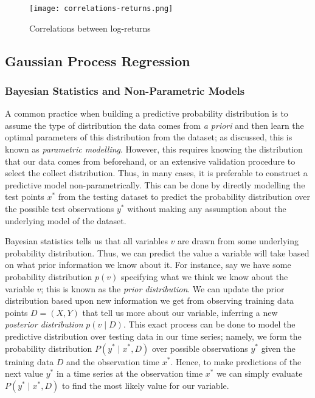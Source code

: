 \documentclass[a4paper, 11pt]{article}
\begin{document}
    \begin{figure}[ht]
        \caption{Correlations between log-returns}
        \centering
        \texttt{[image: correlations-returns.png]}
        \label{fig:corr-returns}
    \end{figure}

    \subsection{Gaussian Process Regression}

    \subsubsection{Bayesian Statistics and Non-Parametric Models}

    A common practice when building a predictive probability distribution is to assume the type of distribution the data comes from \emph{a priori} and then learn the optimal parameters of this distribution from the dataset; as discussed, this is known as \emph{parametric modelling}. However, this requires knowing the distribution that our data comes from beforehand, or an extensive validation procedure to select the collect distribution. Thus, in many cases, it is preferable to construct a predictive model non-parametrically. This can be done by directly modelling the test points $x^*$ from the testing dataset to predict the probability distribution over the possible test observations $y^*$ without making any assumption about the underlying model of the dataset. 

    Bayesian statistics tells us that all variables $v$ are drawn from some underlying probability distribution. Thus, we can predict the value a variable will take based on what prior information we know about it. For instance, say we have some probability distribution $p(v)$ specifying what we think we know about the variable $v$; this is known as the \emph{prior distribution}. We can update the prior distribution based upon new information we get from observing training data points $D = (X, Y)$ that tell us more about our variable, inferring a new \emph{posterior distribution} $p(v \mid D)$. This exact process can be done to model the predictive distribution over testing data in our time series; namely, we form the probability distribution $P(y^* \mid x^*, D)$ over possible observations $y^*$ given the training data $D$ and the observation time $x^*$. Hence, to make predictions of the next value $y^*$ in a time series at the observation time $x^*$ we can simply evaluate $P(y^* \mid x^*, D)$ to find the most likely value for our variable.
\end{document}
